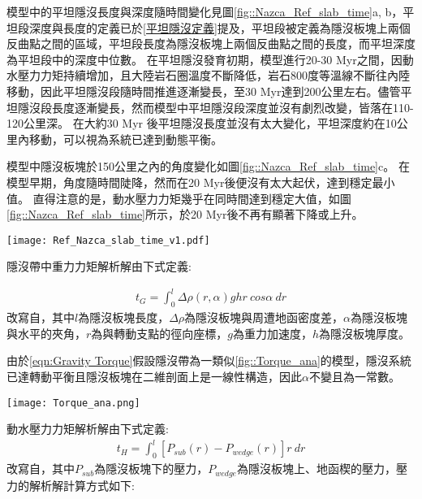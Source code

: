 模型中的平坦隱沒長度與深度隨時間變化見圖\ref{fig::Nazca_Ref_slab_time}a, b，平坦段深度與長度的定義已於\ref{平坦隱沒定義}提及，平坦段被定義為隱沒板塊上兩個反曲點之間的區域，平坦段長度為隱沒板塊上兩個反曲點之間的長度，而平坦深度為平坦段中的深度中位數。
在平坦隱沒發育初期，模型進行20-30 Myr之間，因動水壓力力矩持續增加，且大陸岩石圈溫度不斷降低，岩石800度等溫線不斷往內陸移動，因此平坦隱沒段隨時間推進逐漸變長，至30 Myr達到200公里左右。儘管平坦隱沒段長度逐漸變長，然而模型中平坦隱沒段深度並沒有劇烈改變，皆落在110-120公里深。
在大約30 Myr 後平坦隱沒長度並沒有太大變化，平坦深度約在10公里內移動，可以視為系統已達到動態平衡。

模型中隱沒板塊於150公里之內的角度變化如圖\ref{fig::Nazca_Ref_slab_time}c。
在模型早期，角度隨時間陡降，然而在20 Myr後便沒有太大起伏，達到穩定最小值。
直得注意的是，動水壓力力矩幾乎在同時間達到穩定大值，如圖\ref{fig::Nazca_Ref_slab_time}所示，於20 Myr後不再有顯著下降或上升。

\begin{figure*}[hb]
    \centering
    \texttt{[image: Ref\_Nazca\_slab\_time\_v1.pdf]}
    \caption[納茲卡參考模型隱沒板塊狀態隨時間變化]{納茲卡參考模型隱沒板塊狀態隨時間變化。}
    \label{fig::Nazca_Ref_slab_time}
\end{figure*}


隱沒帶中重力力矩解析解由下式定義:

\begin{align}
    t_G=\int^l_0 \Delta\rho(r,\alpha)ghr\ cos\alpha\ dr
    \label{eqn:Gravity Torque}
\end{align}
改寫自\citealp{stevenson1977angle}，其中$l$為隱沒板塊長度，$\Delta\rho$為隱沒板塊與周遭地函密度差，$\alpha$為隱沒板塊與水平的夾角，$r$為與轉動支點的徑向座標，$g$為重力加速度，$h$為隱沒板塊厚度。

由於\ref{eqn:Gravity Torque}假設隱沒帶為一類似\ref{fig::Torque_ana}的模型，隱沒系統已達轉動平衡且隱沒板塊在二維剖面上是一線性構造，因此$\alpha$不變且為一常數。

\begin{figure*}[hb]
    \centering
    \texttt{[image: Torque\_ana.png]}
    \caption[簡易隱沒帶二為剖面示意圖]{簡易隱沒帶二為剖面示意圖。}
    \label{fig::Torque_ana}
\end{figure*}

動水壓力力矩解析解由下式定義:
\begin{align}
    t_H=\int^l_0 [P_{sub}(r)-P_{wedge}(r)]r\ dr
    \label{eqn:Hydrodynamic Torque}
\end{align}
改寫自\citealp{McKenzie1969}，其中$P_{sub}$為隱沒板塊下的壓力，$P_{wedge}$為隱沒板塊上、地函楔的壓力，壓力的解析解計算方式如下:

